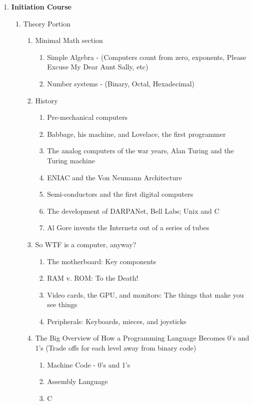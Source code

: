 \documentclass[11pt]{article}
\begin{document}
\begin{enumerate}[I]
	\item \textbf{Initiation Course}
	\begin{enumerate}
		\item Theory Portion
		\begin{enumerate}
			\item Minimal Math section
			\begin{enumerate}
				\item Simple Algebra - (Computers count from zero, exponents, Please Excuse My Dear Aunt Sally, etc)
				\item Number systems - (Binary, Octal, Hexadecimal)
			\end{enumerate}
			\item History
			\begin{enumerate}
				\item Pre-mechanical computers
				\item Babbage, his machine, and Lovelace, the first programmer
				\item The analog computers of the war years, Alan Turing and the Turing machine
				\item ENIAC and the Von Neumann Architecture
				\item Semi-conductors and the first digital computers
				\item The development of DARPANet, Bell Labs; Unix and C
				\item Al Gore invents the Internetz out of a series of tubes 
			\end{enumerate}
			\item So WTF is a computer, anyway?
			\begin{enumerate}
				\item The motherboard: Key components
				\item RAM v. ROM: To the Death!
				\item Video cards, the GPU, and monitors: The things that make you see things
				\item Peripherals: Keyboards, mieces, and joysticks 
			\end{enumerate}
			\item The Big Overview of How a Programming Language Becomes 0's and 1's (Trade offs for each level away from binary code)
			\begin{enumerate}
				\item Machine Code - 0's and 1's
				\item Assembly Language
				\item C

\end{enumerate}
\end{enumerate}
\end{enumerate}
\end{enumerate}
\end{document}
